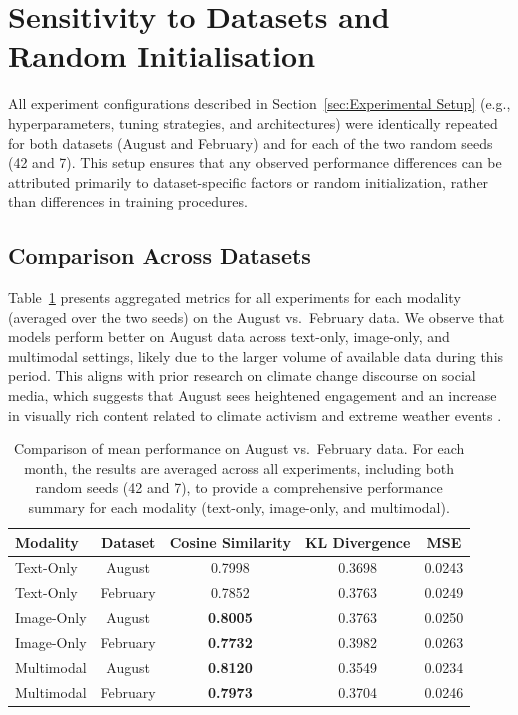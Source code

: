 \section{Sensitivity to Datasets and Random Initialisation}
\label{sec:dataset_seed_variations}

All experiment configurations described in Section~\ref{sec:Experimental Setup} (e.g., hyperparameters, tuning strategies, and architectures) were identically repeated for both datasets (August and February) and for each of the two random seeds (42 and 7). 
This setup ensures that any observed performance differences can be attributed primarily to dataset-specific factors or random initialization, rather than differences in training procedures.

\subsection{Comparison Across Datasets}
\label{subsec:results_datasets}
Table~\ref{tab:dataset_comparison} presents aggregated metrics for all experiments for each modality (averaged over the two seeds) on the August vs.\ February data. We observe that models perform better on August data across text-only, image-only, and multimodal settings, likely due to the larger volume of available data during this period. This aligns with prior research on climate change discourse on social media, which suggests that August sees heightened engagement and an increase in visually rich content related to climate activism and extreme weather events \cite{mooseder_social_2023}.

\begin{table}[ht]
    \centering
    \begin{tabular}{lcccc}
    \toprule
    \textbf{Modality} & \textbf{Dataset} & \textbf{Cosine Similarity} & \textbf{KL Divergence} & \textbf{MSE} \\
    \midrule
    Text-Only & August & 0.7998 &  0.3698 & 0.0243 \\
    Text-Only & February & 0.7852 &  0.3763 & 0.0249 \\
    \midrule
    Image-Only & August & \textbf{0.8005} & 0.3763 & 0.0250 \\
    Image-Only & February & \textbf{0.7732} & 0.3982 & 0.0263 \\
    \midrule
    Multimodal & August & \textbf{0.8120} & 0.3549 & 0.0234 \\
    Multimodal & February & \textbf{0.7973} & 0.3704 & 0.0246 \\
    \bottomrule
    \end{tabular}%
    \caption{Comparison of mean performance on August vs.\ February data. 
    For each month, the results are averaged across all experiments, including both random seeds (42 and 7), to provide a comprehensive performance summary for each modality (text-only, image-only, and multimodal).}

    \label{tab:dataset_comparison}
\end{table}

